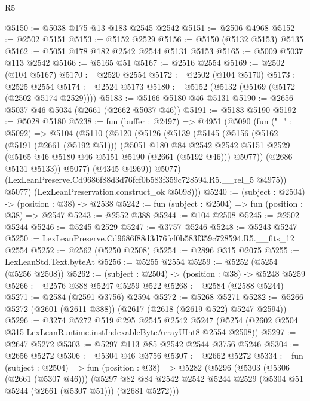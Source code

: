 \begin{lexlean}{R5}
\begin{coremodule}
@5150 := @5038 @175 @13 @183 @2545 @2542
@5151 := @2506 @4968
@5152 := @2502 @5151
@5153 := @5152 @2529
@5156 := @5150 (@5132 @5153) @5135
@5162 := @5051 @178 @182 @2542 @2544 @5131 @5153
@5165 := @5009 @5037 @113 @2542
@5166 := @5165 @51
@5167 := @2516 @2554
@5169 := @2502 (@104 @5167)
@5170 := @2520 @2554
@5172 := @2502 (@104 @5170)
@5173 := @2525 @2554
@5174 := @2524 @5173
@5180 := @5152 (@5132 (@5169 (@5172 (@2502 @5174 @2529))))
@5183 := @5166 @5180 @46 @5131
@5190 := @2656 @5037 @46 @5034 (@2661 (@2662 @5037 @46))
@5191 := @5183 @5190
@5192 := @5028 @5180
@5238 := fun (buffer : @2497) =>
  @4951
    (@5090
      (fun ("_" : @5092) =>
      @5104
        (@5110
          (@5120
            (@5126
              (@5139
                (@5145
                  (@5156
                    (@5162
                      (@5191 (@2661 (@5192 @51)))
                      (@5051
                        @180
                        @84
                        @2542
                        @2542
                        @5151
                        @2529
                        (@5165 @46 @5180 @46 @5151 @5190 (@2661 (@5192 @46)))
                        @5077))
                    (@2686 @5131 @5133))
                  @5077)
                (@4345 @4969))
              @5077)
            (LexLeanPreserve.Cd9686f88d3d76fcf0b583f359c728594.R5.__rel_5 @4975))
          @5077)
        (LexLeanPreservation.construct_ok @5098)))
@5240 := (subject : @2504) -> (position : @38) -> @2538
@5242 := fun (subject : @2504) => fun (position : @38) => @2547
@5243 := @2552 @388
@5244 := @104 @2508
@5245 := @2502 @5244
@5246 := @5245 @2529
@5247 := @3757 @5246
@5248 := @5243 @5247
@5250 := LexLeanPreserve.Cd9686f88d3d76fcf0b583f359c728594.R5.__fits_12 @2554
@5252 := @2562 (@5250 @2508)
@5254 := @2896 @315 @2075
@5255 := LexLeanStd.Text.byteAt
@5256 := @5255 @2554
@5259 := @5252 (@5254 (@5256 @2508))
@5262 := (subject : @2504) -> (position : @38) -> @5248 @5259
@5266 := @2576 @388 @5247 @5259 @522
@5268 := @2584 (@2588 @5244)
@5271 := @2584 (@2591 @3756) @2594
@5272 := @5268 @5271
@5282 := @5266 @5272 (@2601 (@2611 @388)) (@2617 (@2618 (@2619 @522) @5247 @2594))
@5296 := @3274
    @5272
    @519
    @295
    @2545
    @2542
    @5247
    (@5254 (@2602 @2504 @315 LexLeanRuntime.instIndexableByteArrayUInt8 @2554 @2508))
@5297 := @2647 @5272
@5303 := @5297 @113 @85 @2542 @2544 @3756 @5246
@5304 := @2656 @5272
@5306 := @5304 @46 @3756
@5307 := @2662 @5272
@5334 := fun (subject : @2504) =>
  fun (position : @38) =>
  @5282
    (@5296
      (@5303
        (@5306 (@2661 (@5307 @46)))
        (@5297 @82 @84 @2542 @2542 @5244 @2529 (@5304 @51 @5244 (@2661 (@5307 @51))) (@2681 @5272)))

\end{coremodule}
\end{lexlean}
